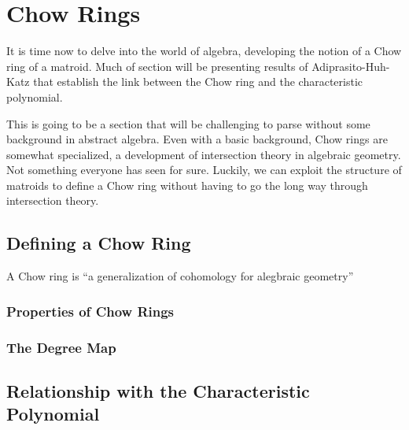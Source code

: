 \documentclass[12pt,oneside]{../../sfsuthesis}
\begin{document}
\chapter{Chow Rings}

It is time now to delve into the world of algebra, developing the notion of a Chow ring of a matroid.
Much of section will be presenting results of Adiprasito-Huh-Katz that establish the link between the Chow ring and the characteristic polynomial.

This is going to be a section that will be challenging to parse without some background in abstract algebra.
Even with a basic background, Chow rings are somewhat specialized, a development of intersection theory in algebraic geometry.
Not something everyone has seen for sure.
Luckily, we can exploit the structure of matroids to define a Chow ring without having to go the long way through intersection theory.

\section{Defining a Chow Ring}

A Chow ring is ``a generalization of cohomology for alegbraic geometry''

\subsection{Properties of Chow Rings}

\subsection{The Degree Map}


\section{Relationship with the Characteristic Polynomial}

\end{document}
